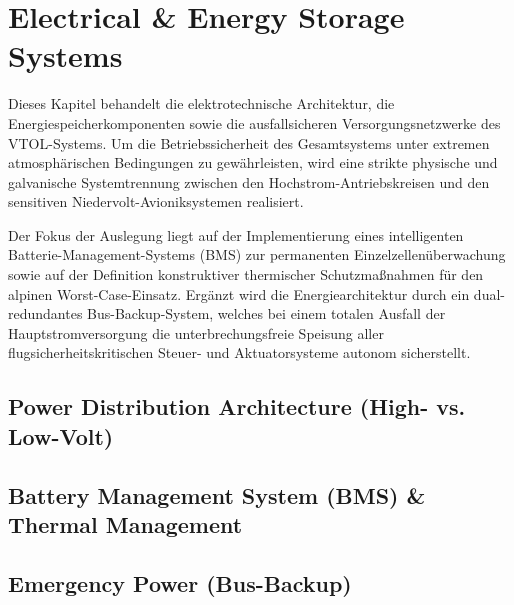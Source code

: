 ﻿\chapter{Electrical \& Energy Storage Systems}
\label{ch:electrical_energy}

Dieses Kapitel behandelt die elektrotechnische Architektur, die Energiespeicherkomponenten sowie die ausfallsicheren Versorgungsnetzwerke des VTOL-Systems. Um die Betriebssicherheit des Gesamtsystems unter extremen atmosphärischen Bedingungen zu gewährleisten, wird eine strikte physische und galvanische Systemtrennung zwischen den Hochstrom-Antriebskreisen und den sensitiven Niedervolt-Avioniksystemen realisiert.

\noindent Der Fokus der Auslegung liegt auf der Implementierung eines intelligenten Batterie-Management-Systems (BMS) zur permanenten Einzelzellenüberwachung sowie auf der Definition konstruktiver thermischer Schutzmaßnahmen für den alpinen Worst-Case-Einsatz. Ergänzt wird die Energiearchitektur durch ein dual-redundantes Bus-Backup-System, welches bei einem totalen Ausfall der Hauptstromversorgung die unterbrechungsfreie Speisung aller flugsicherheitskritischen Steuer- und Aktuatorsysteme autonom sicherstellt.

\section{Power Distribution Architecture (High- vs. Low-Volt)}
\section{Battery Management System (BMS) \& Thermal Management}
\section{Emergency Power (Bus-Backup)}
